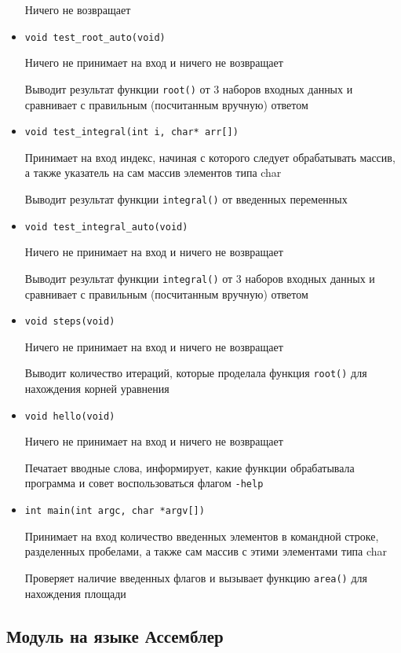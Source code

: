 \documentclass[a4paper,12pt,titlepage,finall]{article}
\begin{document}
\begin{itemize}
Ничего не возвращает
\item {\texttt{void test\_root\_auto(void)}} \par
Ничего не принимает на вход и ничего не возвращает\par
Выводит результат функции \texttt{root()} от 3 наборов входных данных и сравнивает с правильным (посчитанным вручную) ответом
\item {\texttt{void test\_integral(int i, char* arr[])}} \par
Принимает на вход индекс, начиная с которого следует обрабатывать массив, а также указатель на сам массив элементов типа char\par
Выводит результат функции \texttt{integral()} от введенных переменных
\item {\texttt{void test\_integral\_auto(void)}} \par
Ничего не принимает на вход и ничего не возвращает\par
Выводит результат функции \texttt{integral()} от 3 наборов входных данных и сравнивает с правильным (посчитанным вручную) ответом
\item {\texttt{void steps(void)}} \par
Ничего не принимает на вход и ничего не возвращает\par
Выводит количество итераций, которые проделала функция \texttt{root()} для нахождения корней уравнения
\item {\texttt{void hello(void)}} \par
Ничего не принимает на вход и ничего не возвращает\par
Печатает вводные слова, информирует, какие функции обрабатывала программа и совет воспользоваться флагом \texttt{-help}
\item {\texttt{int main(int argc, char *argv[])}} \par
Принимает на вход количество введенных элементов в командной строке, разделенных пробелами, а также сам массив с этими элементами типа char\par
Проверяет наличие введенных флагов и вызывает функцию \texttt{area()} для нахождения площади
\end{itemize}

\subsection{Модуль на языке Ассемблер}
\end{document}
